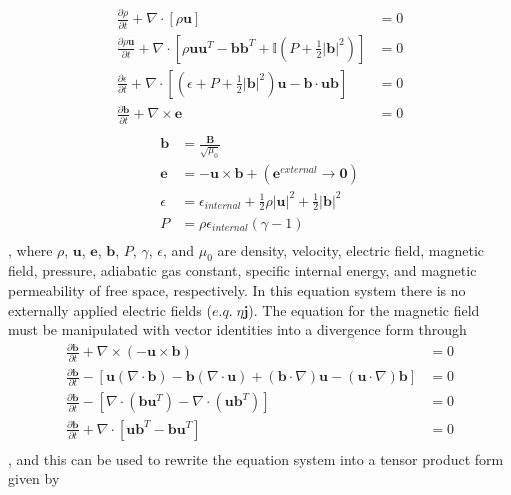 \documentclass[paper=a4, fontsize=11pt]{scrartcl}
\newcommand{\pfrac}[2]{\frac{\partial#1}{\partial#2}}
\numberwithin{equation}{section}                %
\numberwithin{figure}{section}                  %
\numberwithin{table}{section}                           %
\begin{document}
\minipage{\textwidth}
  \begin{align*}
    \pfrac{\rho}{t} + \nabla \cdot \left[\rho \mathbf{u}\right] &= 0 \\
    \pfrac{\rho \mathbf{u}}{t} + \nabla \cdot \left[\rho \mathbf{u}\mathbf{u}^T - \mathbf{b}\mathbf{b}^T + \mathbb{I}\left(P + \frac{1}{2}|\mathbf{b}|^2\right)\right] &= 0 \\
    \pfrac{\epsilon}{t} + \nabla \cdot \left[\left(\epsilon + P + \frac{1}{2}|\mathbf{b}|^2\right)\mathbf{u}- \mathbf{b}\cdot\mathbf{u}\mathbf{b}\right] &= 0 \\
    \pfrac{\mathbf{b}}{t} + \nabla\times\mathbf{e} &= 0 \\
  \end{align*}
  \endminipage\hfill
  \begin{align*}
    \mathbf{b} &= \frac{\mathbf{B}}{\sqrt{\mu_0}} \\
    \mathbf{e} &= - \mathbf{u} \times \mathbf{b} +\left(\mathbf{e}^{external}\rightarrow\mathbf{0}\right)\\
    \epsilon &= \epsilon_{internal} + \frac{1}{2}\rho|\mathbf{u}|^2 + \frac{1}{2}|\mathbf{b}|^2\\
    P &=\rho \epsilon_{internal} (\gamma - 1) \\
  \end{align*}
  \endminipage\hfill
  \endminipage, where $\rho$, $\mathbf{u}$, $\mathbf{e}$, $\mathbf{b}$, $P$, $\gamma$, $\epsilon$, and $\mu_0$ are density, velocity, electric field, magnetic field, pressure, adiabatic gas constant, specific internal energy, and magnetic permeability of free space, respectively. In this equation system there is no externally applied electric fields ($e.q.\;\eta \mathbf{j}$). The equation for the magnetic field must be manipulated with vector identities into a divergence form through
  \begin{align*}
    \pfrac{\mathbf{b}}{t} + \nabla\times(-\mathbf{u}\times\mathbf{b}) &= 0\\
    \pfrac{\mathbf{b}}{t} - \left[\mathbf{u}(\nabla\cdot\mathbf{b})-\mathbf{b}(\nabla\cdot\mathbf{u})+(\mathbf{b}\cdot \nabla)\mathbf{u}-(\mathbf{u}\cdot\nabla)\mathbf{b}\right] &= 0\\
    \pfrac{\mathbf{b}}{t} - \left[\nabla\cdot(\mathbf{b}\mathbf{u}^T)-\nabla\cdot(\mathbf{u}\mathbf{b}^T)\right] &= 0\\
    \pfrac{\mathbf{b}}{t} + \nabla\cdot\left[\mathbf{u}\mathbf{b}^T-\mathbf{b}\mathbf{u}^T\right] &= 0\\
  \end{align*}, and this can be used to rewrite the equation system into a tensor product form given by 
\end{document}
